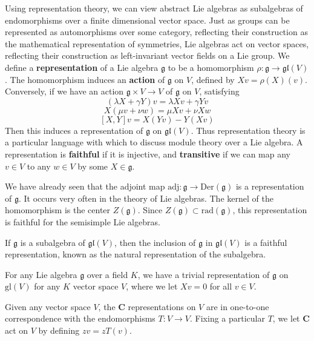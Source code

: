 Using representation theory, we can view abstract Lie algebras as subalgebras of endomorphisms over a finite dimensional vector space. Just as groups can be represented as automorphisms over some category, reflecting their construction as the mathematical representation of symmetries, Lie algebras act on vector spaces, reflecting their construction as left-invariant vector fields on a Lie group. We define a {\bf representation} of a Lie algebra $\mathfrak{g}$ to be a homomorphism $\rho: \mathfrak{g} \to \mathfrak{gl}(V)$. The homomorphism induces an {\bf action} of $\mathfrak{g}$ on $V$, defined by $Xv = \rho(X)(v)$. Conversely, if we have an action $\mathfrak{g} \times V \to V$ of $\mathfrak{g}$ on $V$, satisfying
%
\[ (\lambda X + \gamma Y)v = \lambda Xv + \gamma Yv \]
\[ X(\mu v + \nu w) = \mu Xv + \nu Xw \]
\[ [X,Y] v = X(Yv) - Y(Xv) \]
%
Then this induces a representation of $\mathfrak{g}$ on $\mathfrak{gl}(V)$. Thus representation theory is a particular language with which to discuss module theory over a Lie algebra. A representation is {\bf faithful} if it is injective, and {\bf transitive} if we can map any $v \in V$ to any $w \in V$ by some $X \in \mathfrak{g}$.

\begin{example}
    We have already seen that the adjoint map $\text{adj}: \mathfrak{g} \to \text{Der}(\mathfrak{g})$ is a representation of $\mathfrak{g}$. It occurs very often in the theory of Lie algebras. The kernel of the homomorphism is the center $Z(\mathfrak{g})$. Since $Z(\mathfrak{g}) \subset \text{rad}(\mathfrak{g})$, this representation is faithful for the semisimple Lie algebras.
\end{example}

\begin{example}
    If $\mathfrak{g}$ is a subalgebra of $\mathfrak{gl}(V)$, then the inclusion of $\mathfrak{g}$ in $\mathfrak{gl}(V)$ is a faithful representation, known as the natural representation of the subalgebra.
\end{example}

\begin{example}
    For any Lie algebra $\mathfrak{g}$ over a field $K$, we have a trivial representation of $\mathfrak{g}$ on $\text{gl}(V)$ for any $K$ vector space $V$, where we let $Xv = 0$ for all $v \in V$.
\end{example}

\begin{example}
    Given any vector space $V$, the $\mathbf{C}$ representations on $V$ are in one-to-one correspondence with the endomorphisms $T: V \to V$. Fixing a particular $T$, we let $\mathbf{C}$ act on $V$ by defining $zv = zT(v)$.
\end{example}

